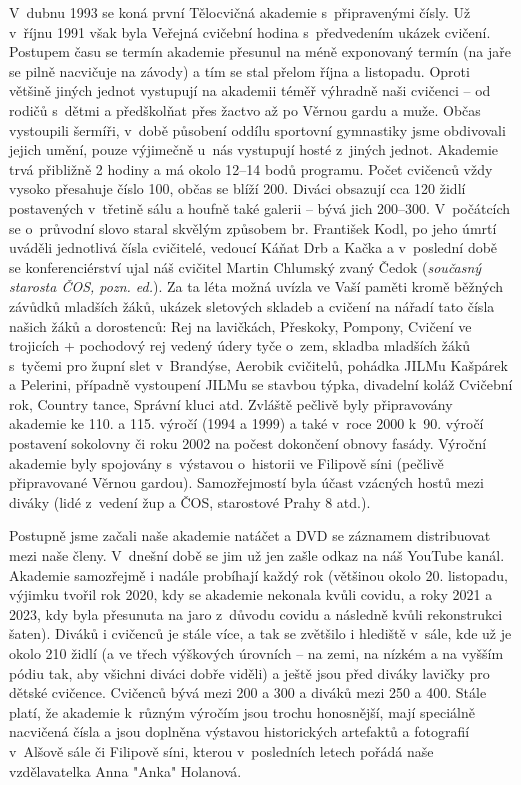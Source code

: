 \documentclass[a5paper, 11pt, twoside]{article}
\begin{document}
V~dubnu 1993 se koná první Tělocvičná akademie s~připravenými čísly. Už
v~říjnu 1991 však byla Veřejná cvičební hodina s~předvedením ukázek
cvičení. Postupem času se termín akademie přesunul na méně exponovaný
termín (na jaře se pilně nacvičuje na závody) a tím se stal přelom října
a listopadu. Oproti většině jiných jednot vystupují na akademii téměř
výhradně naši cvičenci -- od rodičů s~dětmi a předškolňat přes žactvo až
po Věrnou gardu a muže. Občas vystoupili šermíři, v~době působení oddílu
sportovní gymnastiky jsme obdivovali jejich umění, pouze výjimečně u~nás
vystupují hosté z~jiných jednot. Akademie trvá přibližně 2 hodiny a má
okolo 12--14 bodů programu. Počet cvičenců vždy vysoko přesahuje číslo
100, občas se blíží 200. Diváci obsazují cca 120 židlí postavených
v~třetině sálu a houfně také galerii -- bývá jich 200--300. V~počátcích se
o~průvodní slovo staral skvělým způsobem br. František Kodl, po jeho
úmrtí uváděli jednotlivá čísla cvičitelé, vedoucí Káňat Drb a Kačka a
v~poslední době se konferenciérství ujal náš cvičitel Martin Chlumský
zvaný Čedok (\textit{současný starosta ČOS, pozn. ed.}). Za ta léta možná
uvízla ve Vaší paměti kromě běžných závůdků mladších žáků, ukázek
sletových skladeb a cvičení na nářadí tato čísla našich žáků a
dorostenců: Rej na lavičkách, Přeskoky, Pompony, Cvičení ve trojicích +
pochodový rej vedený údery tyče o~zem, skladba mladších žáků s~tyčemi
pro župní slet v~Brandýse, Aerobik cvičitelů, pohádka JILMu Kašpárek a
Pelerini, případně vystoupení JILMu se stavbou týpka, divadelní koláž
Cvičební rok, Country tance, Správní kluci atd. Zvláště pečlivě byly
připravovány akademie ke 110. a 115. výročí (1994 a 1999) a také v~roce
2000 k~90. výročí postavení sokolovny či roku 2002 na počest dokončení
obnovy fasády. Výroční akademie byly spojovány s~výstavou o~historii ve
Filipově síni (pečlivě připravované Věrnou gardou). Samozřejmostí byla
účast vzácných hostů mezi diváky (lidé z~vedení žup a ČOS, starostové
Prahy 8 atd.).

Postupně jsme začali naše akademie natáčet a DVD se záznamem
distribuovat mezi naše členy. V~dnešní době se jim už jen zašle odkaz na
náš YouTube kanál. Akademie samozřejmě i nadále probíhají každý rok
(většinou okolo 20. listopadu, výjimku tvořil rok 2020, kdy se akademie
nekonala kvůli covidu, a roky 2021 a 2023, kdy byla přesunuta na jaro
z~důvodu covidu a následně kvůli rekonstrukci šaten). Diváků i cvičenců je
stále více, a tak se zvětšilo i hlediště v~sále, kde už je okolo 210
židlí (a ve třech výškových úrovních -- na zemi, na nízkém a na vyšším
pódiu tak, aby všichni diváci dobře viděli) a ještě jsou před diváky
lavičky pro dětské cvičence. Cvičenců bývá mezi 200 a 300 a diváků mezi
250 a 400. Stále platí, že akademie k~různým výročím jsou trochu
honosnější, mají speciálně nacvičená čísla a jsou doplněna výstavou
historických artefaktů a fotografií v~Alšově sále či Filipově síni,
kterou v~posledních letech pořádá naše vzdělavatelka Anna "Anka"
Holanová.
\end{document}
